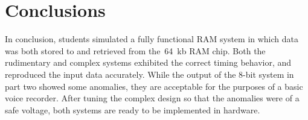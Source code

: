 \section{Conclusions}

In conclusion, students simulated a fully functional RAM system in which data
was both stored to and retrieved from the~\SI{64}{kb} RAM chip.   Both the
rudimentary and complex systems exhibited the correct timing behavior, and
reproduced the input data accurately.  While the output of the 8-bit system in
part two showed some anomalies, they are acceptable for the purposes of a basic
voice recorder.  After tuning the complex design so that the anomalies were of
a safe voltage, both systems are ready to be implemented in hardware.
